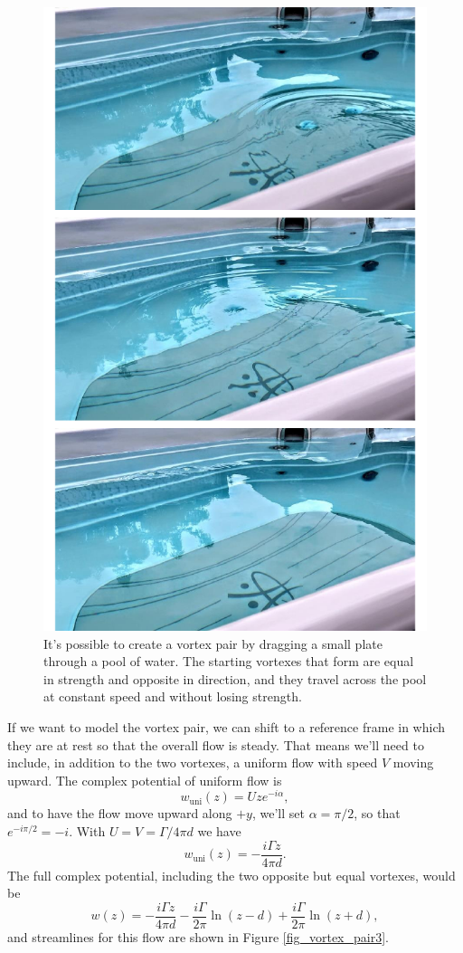 \begin{figure}
\centering\includegraphics[width=0.9\linewidth]{Figures/Chapter4/fig_vortex_pair_pool}
\caption{It's possible to create a vortex pair by dragging a small plate through a pool of water.  The starting vortexes that form are equal in strength and opposite in direction, and they travel across the pool at constant speed and without losing strength.}
\label{fig_vortex_pair_pool}
\end{figure}

If we want to model the vortex pair, we can shift to a reference frame in which they are at rest so that the overall flow is steady.  That means we'll need to include, in addition to the two vortexes, a uniform flow with speed $V$ moving upward.  The complex potential of uniform flow is
\[
w_\text{uni}(z) = Uze^{-i\alpha},
\]
and to have the flow move upward along $+\unit{y}$, we'll set $\alpha = \pi/2$, so that $e^{-i\pi/2} = -i$.  With $U = V = \Gamma/4\pi d$ we have
\[
w_\text{uni}(z) = -\frac{i\Gamma z}{4\pi d}.
\]
The full complex potential, including the two opposite but equal vortexes, would be
\begin{equation}
w(z) = -\frac{i\Gamma z}{4\pi d} - \frac{i\Gamma}{2\pi} \ln (z-d) + \frac{i\Gamma}{2\pi} \ln (z+d),
\end{equation}
and streamlines for this flow are shown in Figure \ref{fig_vortex_pair3}.

